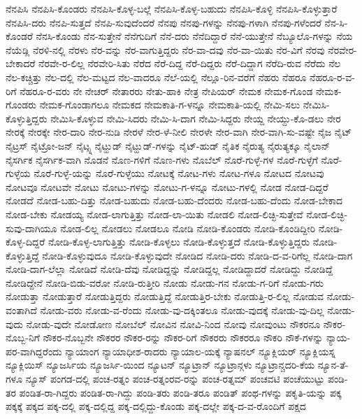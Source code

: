 {ನೆನಪಿಸಿ
ನೆನಪಿಸಿ-ಕೊಂಡರು
ನೆನಪಿಸಿ-ಕೊಳ್ಳ-ಬಲ್ಲೆ
ನೆನಪಿಸಿ-ಕೊಳ್ಳ-ಬಹುದು
ನೆನಪಿಸಿ-ಕೊಳ್ಳಿ
ನೆನಪಿಸಿ-ಕೊಳ್ಳುತ್ತಾರೆ
ನೆನಪಿಸಿ-ದರು
ನೆನಪಿ-ಸುತ್ತದೆ
ನೆನಪಿ-ಸುವುದೆಂದರೆ
ನೆನಪು
ನೆನಪು-ಗಳನ್ನು
ನೆನಪು-ಗಳಾಗಿ
ನೆನಪು-ಗಳೆಂದರೆ
ನೆನ-ಸಿ-ಕೊಂಡರೆ
ನೆನಸಿ-ಕೊಂಡು
ನೆನ-ಸುತ್ತೇನೆ
ನೆನೆಗುದಿಗೆ
ನೆನೆ-ದರು
ನೆನೆದಿದ್ದಾರೆ
ನೆನೆ-ಯುತ್ತೇನೆ
ನೆಬ್ಯೂಲೊ-ಗಳನ್ನು
ನೆಯ
ನೆಯೆಡ್ಲಿ
ನೆರಳಿ-ನಲ್ಲಿ
ನೆರಳು
ನೆರ-ವನ್ನು
ನೆರ-ವಾಗುತ್ತಿದ್ದರು
ನೆರ-ವಾ-ದವು
ನೆರ-ವಾ-ಯಿತು
ನೆರ-ವಿಗೆ
ನೆರವು
ನೆರವೇರ-ಬೇಕಾದರೆ
ನೆರವೇ-ರ-ಲಿಲ್ಲ
ನೆರವೇರಿ-ಸಿತು
ನೆರೆದ
ನೆರೆ-ದಿದ್ದ
ನೆರೆ-ದಿದ್ದರು
ನೆರೆ-ದಿದ್ದಾಗ
ನೆರೆದಿ-ರುವ
ನೆರೆದು
ನೆಲ
ನೆಲ-ಕಚ್ಚಿತ್ತು
ನೆಲ-ದಲ್ಲಿ
ನೆಲ-ಮಟ್ಟದ
ನೆಲ-ವಾದರೂ
ನೆಲೆ-ಯಲ್ಲಿ
ನೆಲ್ಲೂ-ರಿನ-ವರೆಗೆ
ನೆಹರು
ನೆಹರೂ
ನೆಹರೂ-ರ-ವ-ರಿಗೆ
ನೆಹರೂ-ರ-ವರು
ನೇ
ನೇಚರ್
ನೇತಾರರು
ನೇತು-ಹಾಕಿ
ನೇತ್ರ
ನೇಪಿಯರ್
ನೇಮಕ
ನೇಮಕ-ಗೊಂಡ
ನೇಮಕ-ಗೊಂಡರು
ನೇಮಕ-ಗೊಂಡಾಗಲೂ
ನೇಮಕದ
ನೇಮಕಾತಿ-ಗ-ಳನ್ನೂ
ನೇಮಕಾತಿ-ಯಲ್ಲಿ
ನೇಮಿ-ಸಲು
ನೇಮಿಸಿ-ಕೊಳ್ಳುತ್ತಿದ್ದರು
ನೇಮಿಸಿ-ಕೊಳ್ಳುವ
ನೇಮಿ-ಸಿದರು
ನೇಮಿ-ಸಿ-ದಾಗ
ನೇಮಿ-ಸಿದ್ದರು
ನೇಯ್ದ
ನೇಯ್ದು-ಕೊ-ಡಲು
ನೇರ
ನೇರಕ್ಕೆ
ನೇರಕ್ಕೇ
ನೇರ-ದಾರಿ
ನೇರ-ನುಡಿ
ನೇರಳೆ
ನೇರ-ಳೆ-ನೀಲಿ
ನೇರಳೇ
ನೇರ-ವಾಗಿ
ನೇರ-ವಾಗಿ-ಸು-ವಷ್ಟೇ
ನೈಜ
ನೈಟ್
ನೈಟ್ರಸ್
ನೈಟ್ರೋ-ಜನ್
ನೈಟ್ಸ್ನ
ನೈಟ್ಹುಡ್
ನೈಟ್ಹುಡ್-ಗಳನ್ನು
ನೈಟ್-ಹುಡ್
ನೈತಿಕ
ನೈರುತ್ಯ
ನೈರುತ್ಯಕ್ಕೂ
ನೈಲಾನ್
ನೈಸರ್ಗಿಕ
ನೈಸರ್ಗಿಕ-ವಾಗಿ
ನೊಡನೆ
ನೊಣ-ಗಳಿಗೆ
ನೊಣ-ಗಳು
ನೊಬೆಲ್
ನೊರೆ-ಗುಳ್ಳೆ-ಗಳ
ನೊರೆ-ಗುಳ್ಳೆಗೆ
ನೊರೆ-ಗುಳ್ಳೆಯ
ನೊರೆ-ಗುಳ್ಳೆ-ಯನ್ನು
ನೊರೆ-ಗುಳ್ಳೆಯು
ನೋಟಕ್ಕೆ
ನೋಟ-ಗಳು
ನೋಟ-ಗಳೂ
ನೋಟದ
ನೋಟವು
ನೋಟವೂ
ನೋಟವೇ
ನೋಟು
ನೋಟು-ಗಳನ್ನು
ನೋಟು-ಗ-ಳನ್ನೂ
ನೋಟು-ಗಳಲ್ಲಿ
ನೋಡ
ನೋಡ-ದಿದ್ದರೆ
ನೋಡದೆ
ನೋಡ-ಬಹು-ದಿತ್ತು
ನೋಡ-ಬಹುದು
ನೋಡ-ಬಹು-ದೆಂದರು
ನೋಡ-ಬಹು-ದೆಂದು
ನೋಡ-ಬೇಕಾದ
ನೋಡ-ಬೇಕು
ನೋಡಯ್ಯ
ನೋಡ-ಲಾಗುತ್ತಿತ್ತು
ನೋಡ-ಲಾ-ಯಿತು
ನೋಡಲಿ
ನೋಡ-ಲಿಚ್ಛಿ-ಸುತ್ತೇವೆ
ನೋಡ-ಲಿಚ್ಛಿ-ಸುವು-ದಾಗಿಯೂ
ನೋಡ-ಲಿಲ್ಲ
ನೋಡಲು
ನೋಡಲೂ
ನೋಡಿ
ನೋಡಿ-ಕೊಂಡರು
ನೋಡಿ-ಕೊಂಡಿದ್ದೀರಿ
ನೋಡಿ-ಕೊಳ್ಳ-ದಿದ್ದರೆ
ನೋಡಿ-ಕೊಳ್ಳ-ಲಾಗುತ್ತಿತ್ತು
ನೋಡಿ-ಕೊಳ್ಳಲು
ನೋಡಿ-ಕೊಳ್ಳುತ್ತದೆ
ನೋಡಿ-ಕೊಳ್ಳುತ್ತಿದ್ದರು
ನೋಡಿ-ಕೊಳ್ಳುತ್ತಿದ್ದೆ
ನೋಡಿ-ಕೊಳ್ಳುವುದೂ
ನೋಡಿ-ಕೊಳ್ಳುವುದೇ
ನೋಡಿದ
ನೋಡಿ-ದರು
ನೋಡಿ-ದ-ವ-ರಿಗೆಲ್ಲ
ನೋಡಿ-ದಾಗ
ನೋಡಿ-ದಾಗ-ಲೆಲ್ಲಾ
ನೋಡಿದೆ
ನೋಡಿ-ದೆವು
ನೋಡಿದ್ದನ್ನು
ನೋಡಿದ್ದಲ್ಲ
ನೋಡಿದ್ದಾದರೆ
ನೋಡಿದ್ದು
ನೋಡಿದ್ದೆ
ನೋಡಿದ್ದೇನೆ
ನೋಡಿ-ಬಿಡು-ವರೋ
ನೋಡಿ-ರುತ್ತೀರಿ
ನೋಡು
ನೋಡು-ಗನ
ನೋಡು-ಗ-ರಿಗೆ
ನೋಡು-ಗರು
ನೋಡುತ್ತಾ
ನೋಡುತ್ತಾರೆ
ನೋಡುತ್ತಿದ್ದರು
ನೋಡುತ್ತಿದ್ದೆ
ನೋಡುತ್ತಿರ-ಬೇಕು
ನೋಡುತ್ತಿ-ರ-ಲಿಲ್ಲ
ನೋಡುವ
ನೋಡು-ವಂತಾಗಿದೆ
ನೋಡು-ವರು
ನೋಡು-ವ-ರೆಂದು
ನೋಡು-ವು-ದಕ್ಕಿಂತಲೂ
ನೋಡು-ವುದಕ್ಕೆ
ನೋಡು-ವು-ದಿಲ್ಲ
ನೋಡು-ವುದು
ನೋಡು-ವುದೇ
ನೋಡೋಣ
ನೋಬೆಲ್
ನೋವಿನ
ನೋವಿ-ನಿಂದ
ನೋವು
ನೋವುಂಟು
ನೌಕರನೂ
ನೌಕರ-ನೊಬ್ಬ-ನಿಗೆ
ನೌಕರ-ನೊಬ್ಬನೇ
ನೌಕರರ
ನೌಕರ-ರನ್ನು
ನೌಕರ-ರಿಗೆ
ನೌಕರರು
ನೌಕರರೂ
ನೌಕರಿ
ನೌಕೆ-ಗಳನ್ನು
ನ್ಯಾಯ-ಪರ-ವಾಗಿದ್ದರೆಂದು
ನ್ಯಾಯಾಂಗ
ನ್ಯಾಯಾಧೀಶ-ರಾದರು
ನ್ಯಾಯಾಲ-ಯಕ್ಕೆ
ನ್ಯಾಷನಲ್
ನ್ಯೂಕ್ಲಿಯರ್
ನ್ಯೂಕ್ಲಿಯಸ್ನ
ನ್ಯೂಕ್ಲಿಯಿಸ್
ನ್ಯೂಜರ್ಸಿಯ
ನ್ಯೂಜರ್ಸಿ-ಯಿಂದ
ನ್ಯೂಟನ್
ನ್ಯೂಟ್ರಾನ್
ನ್ಯೂಟ್ರಾನ್ಗಳು
ನ್ಯೂಟ್ರಾನ್ಚದರಿ-ಕೆಯ
ನ್ಯೂನ-ತೆ-ಗಳೂ
ನ್ಯೂಸ್
ಪಂಗಡ-ದಲ್ಲಿ
ಪಂಚ-ರತ್ನಂ
ಪಂಚ-ರತ್ನಂರವ-ರನ್ನು
ಪಂಚ-ರತ್ನಮ್
ಪಂಚವಟಿ
ಪಂಚೆಯುಟ್ಟು
ಪಂಡಿ-ತರ
ಪಂಡಿತ-ರಾ-ಗಿದ್ದರು
ಪಂಡಿತ-ರಾ-ಗಿದ್ದು
ಪಂಡಿ-ತರು
ಪಂಡಿ-ತರೂ
ಪಂಡಿತ್
ಪಂಥ-ಗಳನ್ನು
ಪಕೃತಿ-ಯನ್ನು
ಪಕ್ಕ
ಪಕ್ಕಕ್ಕೆ
ಪಕ್ಕದ
ಪಕ್ಕ-ದಲ್ಲಿ
ಪಕ್ಕ-ದಲ್ಲಿದ್ದ
ಪಕ್ಕ-ದಲ್ಲಿದ್ದು-ಕೊಂಡು
ಪಕ್ಕ-ದಲ್ಲೇ
ಪಕ್ಕ-ದ-ವ-ರೊಂದಿಗೆ
ಪಕ್ಷದ
}
